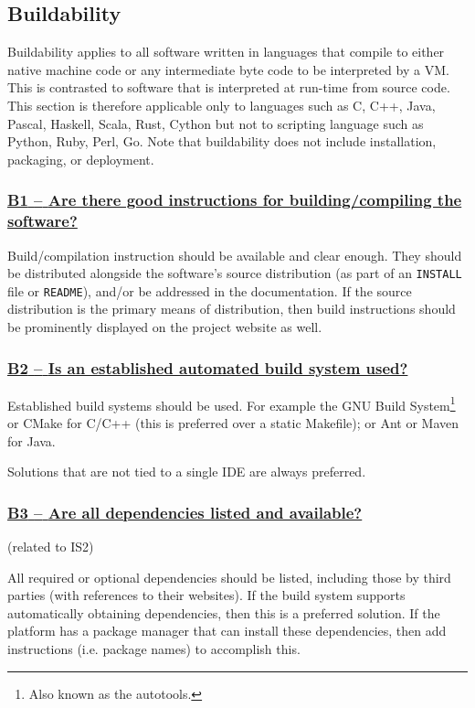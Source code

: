 \documentclass[a4paper,11pt]{article}
\newcommand{\indicator}[1]{\subsubsection*{\underline{#1}}}
\begin{document}
\subsection{Buildability}\label{sec:bui}

Buildability applies to all software written in languages that compile to
either native machine code or any intermediate byte code to be interpreted by a VM.
This is contrasted to software that is interpreted at run-time from source
code. This section is therefore applicable only to languages such as C, C++,
Java, Pascal, Haskell, Scala, Rust, Cython but not to scripting language such
as Python, Ruby, Perl, Go.  Note that buildability does not include
installation, packaging, or deployment.

\newcommand{\bOneName}{B1}
\newcommand{\bOneID}{\bOneName}
\newcommand{\bOneText}{Are there good instructions for building/compiling the software?}
\indicator{\bOneName{ }--{ }\bOneText}\label{id:b1} 

Build/compilation instruction should be available and clear enough. They should
be distributed alongside the software's source distribution (as part of an
\texttt{INSTALL} file or \texttt{README}), and/or be addressed in the documentation. If the
source distribution is the primary means of distribution, then build
instructions should be prominently displayed on the project website as well.

\newcommand{\bTwoName}{B2}
\newcommand{\bTwoID}{\bTwoName}
\newcommand{\bTwoText}{Is an established automated build system used?}
\indicator{\bTwoName{ }--{ }\bTwoText}\label{id:b2} 

Established build systems should be used. For example the GNU Build
System\footnote{Also known as the autotools.} or CMake for C/C++ (this is
preferred over a static Makefile); or Ant or Maven for Java. 

Solutions that are not tied to a single IDE are always preferred.

\newcommand{\bThreeName}{B3}
\newcommand{\bThreeID}{\bThreeName}
\newcommand{\bThreeText}{Are all dependencies listed and available?}
\indicator{\bThreeName{ }--{ }\bThreeText}\label{id:b3}
(related to IS2)

All required or optional dependencies should be listed, including those by
third parties (with references to their websites). If the build system supports
automatically obtaining dependencies, then this is a preferred solution. If the
platform has a package manager that can install these dependencies, then add
instructions (i.e. package names) to accomplish this.
\end{document}
